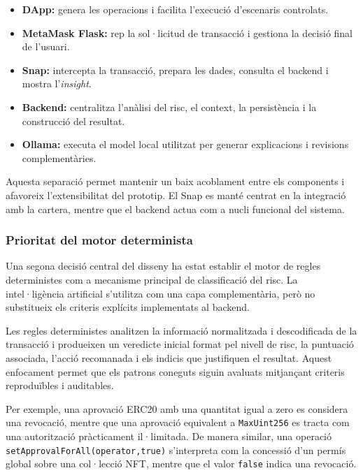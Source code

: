 \begin{itemize}
    \item \textbf{DApp:} genera les operacions i facilita l’execució d’escenaris controlats.
    
    \item \textbf{MetaMask Flask:} rep la sol·licitud de transacció i gestiona la decisió final de l’usuari.
    
    \item \textbf{Snap:} intercepta la transacció, prepara les dades, consulta el backend i mostra l’\textit{insight}.
    
    \item \textbf{Backend:} centralitza l’anàlisi del risc, el context, la persistència i la construcció del resultat.
    
    \item \textbf{Ollama:} executa el model local utilitzat per generar explicacions i revisions complementàries.
\end{itemize}

Aquesta separació permet mantenir un baix acoblament entre els components i afavoreix l’extensibilitat del prototip. El Snap es manté centrat en la integració amb la cartera, mentre que el backend actua com a nucli funcional del sistema.


\subsubsection{Prioritat del motor determinista}
\label{sec:prioritat_motor_determinista}

Una segona decisió central del disseny ha estat establir el motor de regles deterministes com a mecanisme principal de classificació del risc. La intel·ligència artificial s’utilitza com una capa complementària, però no substitueix els criteris explícits implementats al backend.

Les regles deterministes analitzen la informació normalitzada i descodificada de la transacció i produeixen un veredicte inicial format pel nivell de risc, la puntuació associada, l’acció recomanada i els indicis que justifiquen el resultat. Aquest enfocament permet que els patrons coneguts siguin avaluats mitjançant criteris reproduïbles i auditables.

Per exemple, una aprovació ERC20 amb una quantitat igual a zero es considera una revocació, mentre que una aprovació equivalent a \texttt{MaxUint256} es tracta com una autorització pràcticament il·limitada. De manera similar, una operació \texttt{setApprovalForAll(operator,true)} s’interpreta com la concessió d’un permís global sobre una col·lecció NFT, mentre que el valor \texttt{false} indica una revocació.

